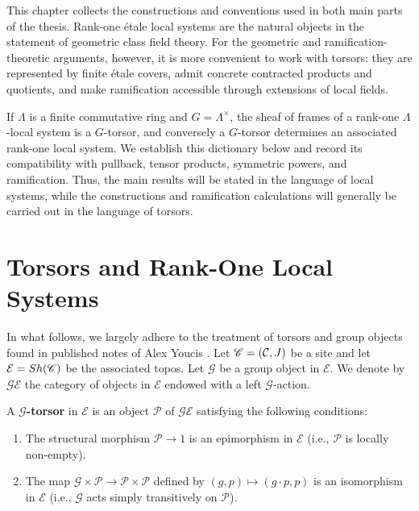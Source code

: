 This chapter collects the constructions and conventions used in both main parts of
the thesis. Rank-one \'etale local systems are the natural objects in the statement
of geometric class field theory. For the geometric and ramification-theoretic
arguments, however, it is more convenient to work with torsors: they are represented
by finite \'etale covers, admit concrete contracted products and quotients, and make
ramification accessible through extensions of local fields.

If \(\Lambda\) is a finite commutative ring and \(G=\Lambda^\times\), the sheaf of
frames of a rank-one \(\Lambda\)-local system is a \(G\)-torsor, and conversely a
\(G\)-torsor determines an associated rank-one local system. We establish this
dictionary below and record its compatibility with pullback, tensor products,
symmetric powers, and ramification. Thus, the main results will be stated in the
language of local systems, while the constructions and ramification calculations
will generally be carried out in the language of torsors.

\section{Torsors and Rank-One Local Systems}

In what follows, we largely adhere to the treatment of torsors and group objects found in published notes of Alex Youcis \cite{YoucisTorsors}.
Let $\mathscr{C}=(\mathcal{C}, J)$ be a site and let $\mathcal{E}=Sh(\mathscr{C})$ be the associated topos. 
Let $\mathcal{G}$ be a group object in $\mathcal{E}$. 
We denote by $\mathcal{G}\mathcal{E}$ the category of objects in $\mathcal{E}$ endowed with a left $\mathcal{G}$-action. 

\begin{definition}
    A \textbf{$\mathcal{G}$-torsor} in $\mathcal{E}$ is an object $\mathcal{P}$ of $\mathcal{G}\mathcal{E}$ satisfying the following conditions:
    \begin{enumerate}
        \item The structural morphism $\mathcal{P} \to 1$ is an epimorphism in $\mathcal{E}$ (i.e., $\mathcal{P}$ is locally non-empty).
        \item The map $\mathcal{G} \times \mathcal{P} \to \mathcal{P} \times \mathcal{P}$ defined by $(g, p) \mapsto (g \cdot p, p)$ is an isomorphism in $\mathcal{E}$ (i.e., $\mathcal{G}$ acts simply transitively on $\mathcal{P}$).
    \end{enumerate}
\end{definition}

